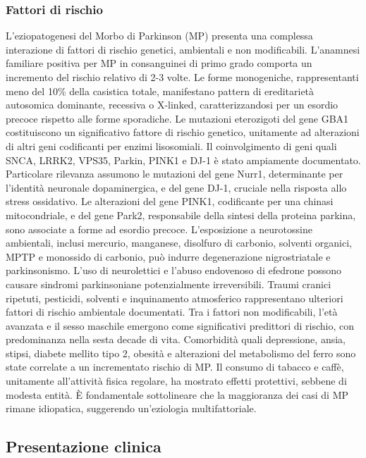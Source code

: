 \subsubsection{Fattori di rischio}
L'eziopatogenesi del Morbo di Parkinson (MP) presenta una complessa interazione di fattori di rischio genetici, ambientali e non modificabili. L'anamnesi familiare positiva per MP in consanguinei di primo grado comporta un incremento del rischio relativo di 2-3 volte. Le forme monogeniche, rappresentanti meno del 10\% della casistica totale, manifestano pattern di ereditarietà autosomica dominante, recessiva o X-linked, caratterizzandosi per un esordio precoce rispetto alle forme sporadiche.
Le mutazioni eterozigoti del gene GBA1 costituiscono un significativo fattore di rischio genetico, unitamente ad alterazioni di altri geni codificanti per enzimi lisosomiali. Il coinvolgimento di geni quali SNCA, LRRK2, VPS35, Parkin, PINK1 e DJ-1 è stato ampiamente documentato. Particolare rilevanza assumono le mutazioni del gene Nurr1, determinante per l'identità neuronale dopaminergica, e del gene DJ-1, cruciale nella risposta allo stress ossidativo. Le alterazioni del gene PINK1, codificante per una chinasi mitocondriale, e del gene Park2, responsabile della sintesi della proteina parkina, sono associate a forme ad esordio precoce.
L'esposizione a neurotossine ambientali, inclusi mercurio, manganese, disolfuro di carbonio, solventi organici, MPTP e monossido di carbonio, può indurre degenerazione nigrostriatale e parkinsonismo. L'uso di neurolettici e l'abuso endovenoso di efedrone possono causare sindromi parkinsoniane potenzialmente irreversibili. Traumi cranici ripetuti, pesticidi, solventi e inquinamento atmosferico rappresentano ulteriori fattori di rischio ambientale documentati.
Tra i fattori non modificabili, l'età avanzata e il sesso maschile emergono come significativi predittori di rischio, con predominanza nella sesta decade di vita. Comorbidità quali depressione, ansia, stipsi, diabete mellito tipo 2, obesità e alterazioni del metabolismo del ferro sono state correlate a un incrementato rischio di MP.
Il consumo di tabacco e caffè, unitamente all'attività fisica regolare, ha mostrato effetti protettivi, sebbene di modesta entità. È fondamentale sottolineare che la maggioranza dei casi di MP rimane idiopatica, suggerendo un'eziologia multifattoriale.

\subsection{Presentazione  clinica}

